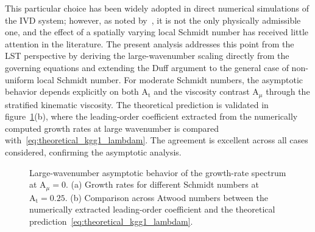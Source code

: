 \documentclass[11pt]{article}
\newcommand{\Atw}{\mathrm{A_t}}
\newcommand{\Amu}{\mathrm{A}_{\mu}}
\newif\ifloadfig
\newcommand{\figfile}[1]{\ifloadfig\fi}
\begin{document}
This particular choice has been widely adopted in direct numerical simulations of the IVD system; however, as noted by~\citet{livescu-2020}, it is not the only physically admissible one, and the effect of a spatially varying local Schmidt number has received little attention in the literature. The present analysis addresses this point from the LST perspective by deriving the large-wavenumber scaling directly from the governing equations and extending the Duff argument to the general case of non-uniform local Schmidt number. For moderate Schmidt numbers, the asymptotic behavior depends explicitly on both \(\Atw\) and the viscosity contrast \(\mathrm{A}_{\mu}\) through the stratified kinematic viscosity. The theoretical prediction is validated in figure~\ref{fig:plot_kgg1}(b), where the leading-order coefficient extracted from the numerically computed growth rates at large wavenumber is compared with~\eqref{eq:theoretical_kgg1_lambdam}. The agreement is excellent across all cases considered, confirming the asymptotic analysis.
\begin{figure}
    \centering
    \begin{minipage}[b]{0.48\textwidth}
        \centering
        \vspace{0pt}
        \figfile{figures/wr_Amu_0.036_At_0.247.tex}
    \end{minipage}
    \hfill
    \begin{minipage}[b]{0.48\textwidth}
        \centering
        \vspace{0pt}
        \figfile{figures/kgg1_factor_Amu_0.036.tex}
    \end{minipage}
    \caption{Large-wavenumber asymptotic behavior of the growth-rate spectrum at \(\Amu = 0\). (a) Growth rates for different Schmidt numbers at \(\Atw = 0.25\). (b) Comparison across Atwood numbers between the numerically extracted leading-order coefficient and the theoretical prediction~\eqref{eq:theoretical_kgg1_lambdam}.}
    \label{fig:plot_kgg1}
\end{figure}
\end{document}
